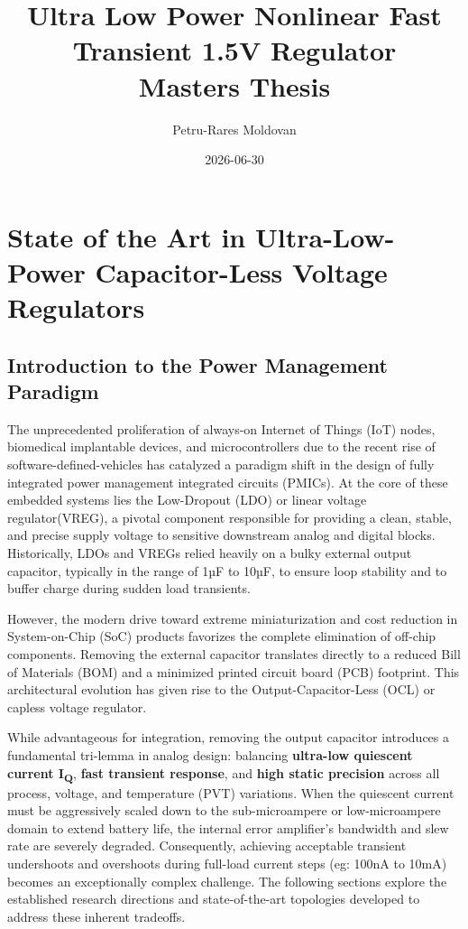 \documentclass[
]{article}
\title{Ultra Low Power Nonlinear Fast Transient 1.5V Regulator \\ Masters Thesis}
\author{Petru-Rares Moldovan}
\date{2026-06-30}
\let\oldsection\section
\renewcommand{\section}{\clearpage\oldsection}
\begin{document}
\maketitle

\section{State of the Art in Ultra-Low-Power Capacitor-Less Voltage
Regulators}\label{_state_of_the_art_in_ultra_low_power_capacitor_less_voltage_regulators}

\subsection{Introduction to the Power Management
Paradigm}\label{_introduction_to_the_power_management_paradigm}

The unprecedented proliferation of always-on Internet of Things (IoT)
nodes, biomedical implantable devices, and microcontrollers due to the
recent rise of software-defined-vehicles has catalyzed a paradigm shift
in the design of fully integrated power management integrated circuits
(PMICs). At the core of these embedded systems lies the Low-Dropout
(LDO) or linear voltage regulator(VREG), a pivotal component responsible
for providing a clean, stable, and precise supply voltage to sensitive
downstream analog and digital blocks. Historically, LDOs and VREGs
relied heavily on a bulky external output capacitor, typically in the
range of 1µF to 10µF, to ensure loop stability and to buffer charge
during sudden load transients.

However, the modern drive toward extreme miniaturization and cost
reduction in System-on-Chip (SoC) products favorizes the complete
elimination of off-chip components. Removing the external capacitor
translates directly to a reduced Bill of Materials (BOM) and a minimized
printed circuit board (PCB) footprint. This architectural evolution has
given rise to the Output-Capacitor-Less (OCL) or capless voltage
regulator.

While advantageous for integration, removing the output capacitor
introduces a fundamental tri-lemma in analog design: balancing
\textbf{ultra-low quiescent current I\textsubscript{Q}}, \textbf{fast
transient response}, and \textbf{high static precision} across all
process, voltage, and temperature (PVT) variations. When the quiescent
current must be aggressively scaled down to the sub-microampere or
low-microampere domain to extend battery life, the internal error
amplifier's bandwidth and slew rate are severely degraded. Consequently,
achieving acceptable transient undershoots and overshoots during
full-load current steps (eg: 100nA to 10mA) becomes an exceptionally
complex challenge. The following sections explore the established
research directions and state-of-the-art topologies developed to address
these inherent tradeoffs.
\end{document}
